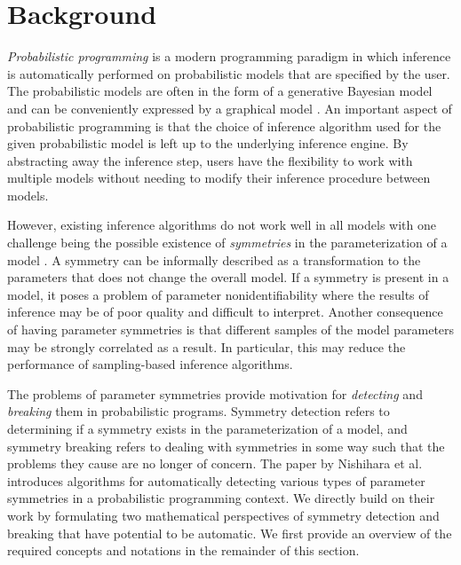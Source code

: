 

\section{Background}

\textit{Probabilistic programming} is a modern programming paradigm in which inference is automatically performed on probabilistic models that are specified by the user. The probabilistic models are often in the form of a generative Bayesian model and can be conveniently expressed by a graphical model \cite{Rainforth:2017}. An important aspect of probabilistic programming is that the choice of inference algorithm used for the given probabilistic model is left up to the underlying inference engine. By abstracting away the inference step, users have the flexibility to work with multiple models without needing to modify their inference procedure between models.

However, existing inference algorithms do not work well in all models with one challenge being the possible existence of \textit{symmetries} in the parameterization of a model \cite{Nishihara:2013}. A symmetry can be informally described as a transformation to the parameters that does not change the overall model. If a symmetry is present in a model, it poses a problem of parameter nonidentifiability where the results of inference may be of poor quality and difficult to interpret. Another consequence of having parameter symmetries is that different samples of the model parameters may be strongly correlated as a result. In particular, this may reduce the performance of sampling-based inference algorithms.

The problems of parameter symmetries provide motivation for \textit{detecting} and \textit{breaking} them in probabilistic programs. Symmetry detection refers to determining if a symmetry exists in the parameterization of a model, and symmetry breaking refers to dealing with symmetries in some way such that the problems they cause are no longer of concern. The paper by Nishihara et al. \cite{Nishihara:2013} introduces algorithms for automatically detecting various types of parameter symmetries in a probabilistic programming context. We directly build on their work by formulating two mathematical perspectives of symmetry detection and breaking that have potential to be automatic. We first provide an overview of the required concepts and notations in the remainder of this section.



